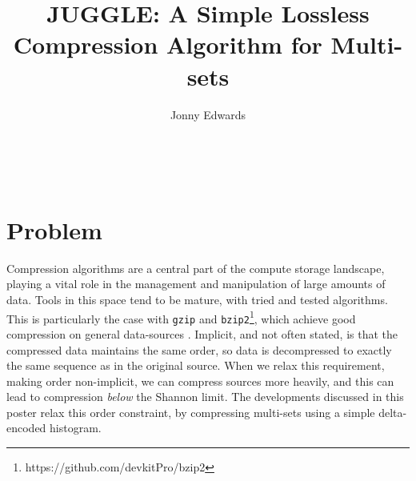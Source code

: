 \documentclass[a0paper,fleqn]{betterposter}
\begin{document}
{{
\vfill
}{
\vfill


}

}{
\title{JUGGLE: A Simple Lossless Compression Algorithm for Multi-sets}
\author{Jonny Edwards}
\\
\section{Problem}
Compression algorithms are a central part of the compute storage landscape, playing a vital role in the management and manipulation of large amounts of data. Tools in this space tend to be mature, with tried and tested algorithms. This is particularly the case with \texttt{gzip} \cite{rfc1952} and \texttt{bzip2}\footnote{\huge https://github.com/devkitPro/bzip2}, which achieve good compression on general data-sources \cite{MacKay:2002:ITI:971143}. Implicit, and not often stated, is that the compressed data maintains the same order, so data is decompressed to exactly the same sequence as in the original source. When we relax this requirement, making order non-implicit, we can compress sources more heavily, and this can lead to compression \textit{below} the Shannon limit. The developments discussed in this poster relax this order constraint, by compressing multi-sets using a simple delta-encoded histogram.  

}
\end{document}
